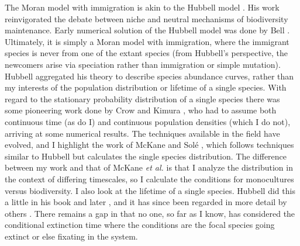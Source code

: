 The Moran model with immigration is akin to the Hubbell model \cite{Hubbell2001}. %
His work reinvigorated the debate between niche and neutral mechanisms of biodiversity maintenance. 
Early numerical solution of the Hubbell model was done by Bell \cite{Bell2001}. %
Ultimately, it is simply a Moran model with immigration, where the immigrant species is never from one of the extant species (from Hubbell's perspective, the newcomers arise via speciation rather than immigration or simple mutation). 
Hubbell aggregated his theory to describe species abundance curves, rather than my interests of the population distribution or lifetime of a single species. 
With regard to the stationary probability distribution of a single species there was some pioneering work done by Crow and Kimura \cite{Crow1956,Kimura1983}, who had to assume both continuous time (as do I) and continuous population densities (which I do not), arriving at some numerical results. 
The techniques available in the field have evolved, and I highlight the work of McKane and Sol\'{e} \cite{McKane2003}, which follows techniques similar to Hubbell but calculates the single species distribution. %
The difference between my work and that of McKane \emph{et al.} is that I analyze the distribution in the context of differing timescales, so I calculate the conditions for monocultures versus biodiversity. 
I also look at the lifetime of a single species. 
Hubbell did this a little in his book \cite{Hubbell2001} and later \cite{Hubbell2003}, and it has since been regarded in more detail by others \cite{Pigolotti2005,Kessler2015}. 
There remains a gap in that no one, so far as I know, has considered the conditional extinction time where the conditions are the focal species going extinct or else fixating in the system. 
